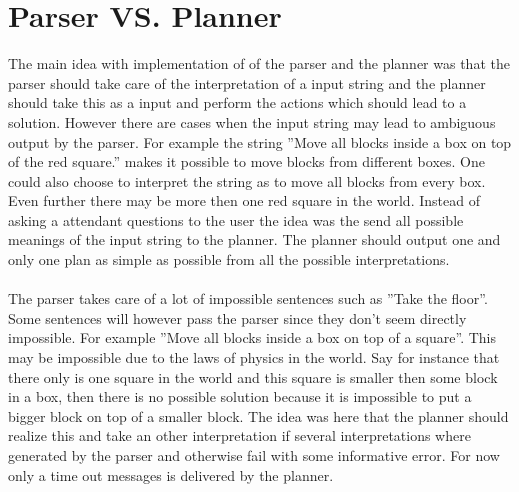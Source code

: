 \section{Parser VS. Planner}
The main idea with implementation of of the parser and the planner was that the
parser should take care of the interpretation of a input string and the planner
should take this as a input and perform the actions which should lead to a
solution. However there are cases when the input string may lead to
ambiguous output by the parser. For example the string ''Move all blocks inside a box on top
of the red square.'' makes it possible to move blocks from different boxes. One could
also choose to interpret the string as to move all blocks from every box. Even
further there may be more then one red square in the world. Instead of asking a
attendant questions to the user the idea was the send all possible meanings of
the input string to the planner. The planner should output one and only one plan as simple as
possible from all the possible interpretations. 
\\\\
The parser takes care of a lot of impossible sentences such as ''Take the
floor''. Some sentences will however pass the parser since they don't seem
directly impossible. For example ''Move all blocks inside a box on top of a
square''. This may be impossible due to the laws of physics in the world. Say
for instance that there only is one square in the world and this square is
smaller then some block in a box, then there is no possible solution because it
is impossible to put a bigger block on top of a smaller block. The idea
was here that the planner should realize this and take an other interpretation if
several interpretations where generated by the parser and otherwise fail with
some informative error. For now only a time out messages is  delivered by the
planner.           



